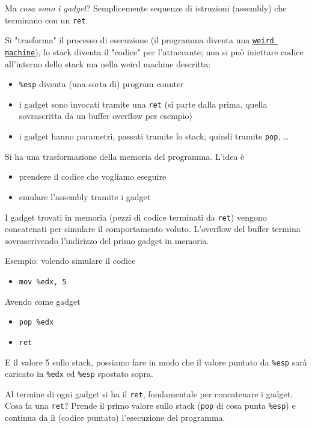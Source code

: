Ma \textit{cosa sono i gadget}? Semplicemente sequenze di istruzioni (assembly) che terminano con un \texttt{ret}. 

Si "trasforma" il processo di esecuzione (il programma diventa una \href{https://en.wikipedia.org/wiki/Weird_machine}{\texttt{weird machine}}), lo stack diventa il "codice" per l'attaccante; non si può iniettare codice all'interno dello stack ma nella weird machine descritta:
\begin{itemize}
	\item \texttt{\%esp} diventa (una sorta di) program counter
    
	\item i gadget sono invocati tramite una \texttt{ret} (si parte dalla prima, quella sovrascritta da un buffer overflow per esempio)
	
    \item i gadget hanno parametri, passati tramite lo stack, quindi tramite \texttt{pop}, \dots 
\end{itemize}

Si ha una trasformazione della memoria del programma. L'idea è
\begin{itemize}
	\item prendere il codice che vogliamo eseguire
	
    \item emulare l'assembly tramite i gadget
\end{itemize}

I gadget trovati in memoria (pezzi di codice terminati da \texttt{ret}) vengono concatenati per simulare il comportamento voluto. L'overflow del buffer termina sovrascrivendo l'indirizzo del primo gadget in memoria. 

Esempio: volendo simulare il codice
\begin{itemize}[label*=]
	\item \texttt{mov \%edx, 5}
\end{itemize}

Avendo come gadget
\begin{itemize}[label*=, noitemsep]
	\item \texttt{pop \%edx}
	\item \texttt{ret}
\end{itemize}

E il valore 5 sullo stack, possiamo fare in modo che il valore puntato da \texttt{\%esp} sarà caricato in \texttt{\%edx} ed \texttt{\%esp} spostato sopra. 

Al termine di ogni gadget si ha il \texttt{ret}, fondamentale per concatenare i gadget. Cosa fa una \texttt{ret}? Prende il primo valore sullo stack (\texttt{pop} di cosa punta \texttt{\%esp}) e continua da lì (codice puntato) l'esecuzione del programma. 

